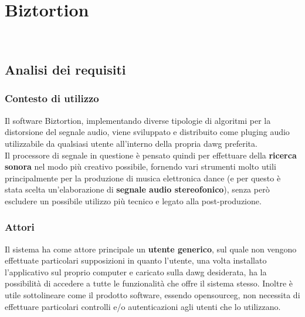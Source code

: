 
\chapter{Biztortion}
\label{cap:biztortion}

\\

\section{Analisi dei requisiti}
\label{sez:analisi-requisiti}
\subsection{Contesto di utilizzo}
Il software Biztortion, implementando diverse tipologie di algoritmi per la distorsione del segnale audio, viene sviluppato e distribuito come \gls{pluging} audio utilizzabile da qualsiasi utente all'interno della propria \gls{dawg} preferita. \\
Il processore di segnale in questione è pensato quindi per effettuare della \textbf{ricerca sonora} nel modo più creativo possibile, fornendo vari strumenti molto utili principalmente per la produzione di musica elettronica dance (e per questo è stata scelta un'elaborazione di \textbf{segnale audio stereofonico}), senza però escludere un possibile utilizzo più tecnico e legato alla post-produzione.

\subsection{Attori}
Il sistema ha come attore principale un \textbf{utente generico}, sul quale non vengono effettuate particolari supposizioni in quanto l'utente, una volta installato l'applicativo sul proprio computer e caricato sulla \gls{dawg} desiderata, ha la possibilità di accedere a tutte le funzionalità che offre il sistema stesso. Inoltre è utile sottolineare come il prodotto software, essendo \gls{opensourceg}, non necessita di effettuare particolari controlli e/o autenticazioni agli utenti che lo utilizzano.

